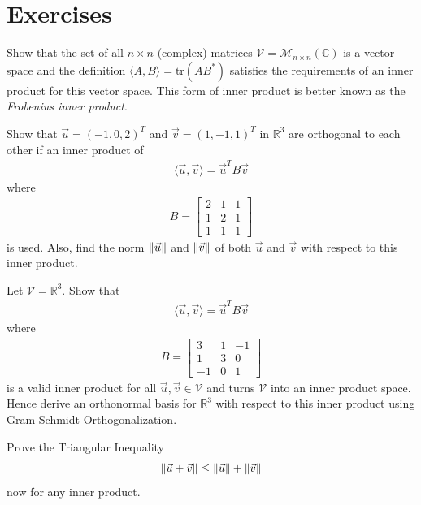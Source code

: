 \section{Exercises}

\begin{Exercise}
Show that the set of all $n \times n$ (complex) matrices $\mathcal{V} = \mathcal{M}_{n \times n}(\mathbb{C})$ is a vector space and the definition $\langle A, B\rangle = \text{tr}(AB^*)$ satisfies the requirements of an inner product for this vector space. This form of inner product is better known as the \textit{Frobenius inner product}.
\end{Exercise}

\begin{Exercise}
Show that $\vec{u} = (-1,0,2)^T$ and $\vec{v} = (1,-1,1)^T$ in $\mathbb{R}^3$ are orthogonal to each other if an inner product of
\begin{align*}
\langle\vec{u}, \vec{v}\rangle = \vec{u}^TB\vec{v}
\end{align*}
where 
\begin{align*}
B = 
\begin{bmatrix}
2 & 1 & 1 \\
1 & 2 & 1 \\
1 & 1 & 1
\end{bmatrix}
\end{align*}
is used. Also, find the norm $\norm{\vec{u}}$ and $\norm{\vec{v}}$ of both $\vec{u}$ and $\vec{v}$ with respect to this inner product.
\end{Exercise}

\begin{Exercise}
Let $\mathcal{V} = \mathbb{R}^3$. Show that
\begin{align*}
\langle\vec{u}, \vec{v}\rangle = \vec{u}^TB\vec{v}
\end{align*}
where 
\begin{align*}
B = 
\begin{bmatrix}
3 & 1 & -1 \\ 
1 & 3 & 0 \\ 
-1 & 0 & 1
\end{bmatrix}
\end{align*}
is a valid inner product for all $\vec{u}, \vec{v} \in \mathcal{V}$ and turns $\mathcal{V}$ into an inner product space. Hence derive an orthonormal basis for $\mathbb{R}^3$ with respect to this inner product using Gram-Schmidt Orthogonalization. 
\end{Exercise}

\begin{Exercise}
Prove the Triangular Inequality
\begin{align*}
\norm{\vec{u} + \vec{v}} \leq \norm{\vec{u}} + \norm{\vec{v}}
\end{align*}
now for any inner product.
\end{Exercise}

